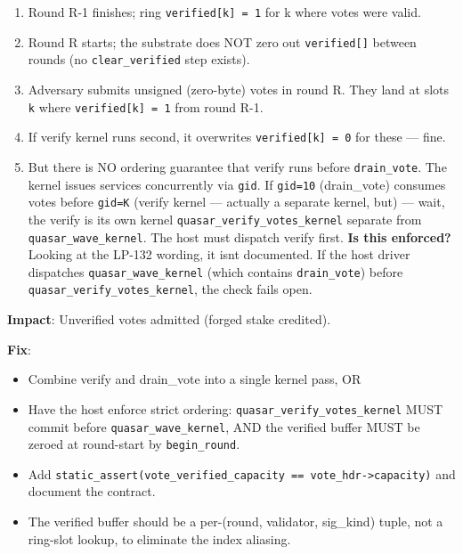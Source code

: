 \documentclass[
]{article}
\providecommand{\tightlist}{%
  \setlength{\itemsep}{0pt}\setlength{\parskip}{0pt}}
\begin{document}
\begin{enumerate}
\def\labelenumi{\arabic{enumi}.}
\tightlist
\item
  Round R-1 finishes; ring \texttt{verified{[}k{]}\ =\ 1} for k where
  votes were valid.
\item
  Round R starts; the substrate does NOT zero out
  \texttt{verified{[}{]}} between rounds (no \texttt{clear\_verified}
  step exists).
\item
  Adversary submits unsigned (zero-byte) votes in round R. They land at
  slots \texttt{k} where \texttt{verified{[}k{]}\ =\ 1} from round R-1.
\item
  If verify kernel runs second, it overwrites
  \texttt{verified{[}k{]}\ =\ 0} for these --- fine.
\item
  But there is NO ordering guarantee that verify runs before
  \texttt{drain\_vote}. The kernel issues services concurrently via
  \texttt{gid}. If \texttt{gid=10} (drain\_vote) consumes votes before
  \texttt{gid=K} (verify kernel --- actually a separate kernel, but) ---
  wait, the verify is its own kernel
  \texttt{quasar\_verify\_votes\_kernel} separate from
  \texttt{quasar\_wave\_kernel}. The host must dispatch verify first.
  \textbf{Is this enforced?} Looking at the LP-132 wording, it
  isn\textquotesingle t documented. If the host driver dispatches
  \texttt{quasar\_wave\_kernel} (which contains \texttt{drain\_vote})
  before \texttt{quasar\_verify\_votes\_kernel}, the check fails open.
\end{enumerate}

\textbf{Impact}: Unverified votes admitted (forged stake credited).

\textbf{Fix}:

\begin{itemize}
\tightlist
\item
  Combine verify and drain\_vote into a single kernel pass, OR
\item
  Have the host enforce strict ordering:
  \texttt{quasar\_verify\_votes\_kernel} MUST commit before
  \texttt{quasar\_wave\_kernel}, AND the verified buffer MUST be zeroed
  at round-start by \texttt{begin\_round}.
\item
  Add
  \texttt{static\_assert(vote\_verified\_capacity\ ==\ vote\_hdr-\textgreater{}capacity)}
  and document the contract.
\item
  The verified buffer should be a per-(round, validator, sig\_kind)
  tuple, not a ring-slot lookup, to eliminate the index aliasing.
\end{itemize}
\end{document}
